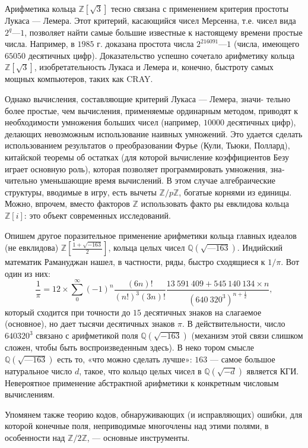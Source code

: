 \documentclass{mai_book}
\begin{document}
\pagebreak

Арифметика кольца $\mathbb{Z}[\sqrt{3}]$ тесно связана с применением критерия
простоты Лукаса — Лемера. Этот критерий, касающийся чисел Мерсенна, т.е. чисел вида $2^q—1$, позволяет найти самые большие известные
к настоящему времени простые числа. Например, в $1985$ г. доказана
простота числа $2^{216091}—1$ (числа, имеющего $65050$ десятичных цифр).
Доказательство успешно сочетало арифметику кольца $\mathbb{Z}[\sqrt{3}]$, изобрета­тельность Лукаса и Лемера и, конечно, быстроту самых мощных ком­пьютеров, таких как CRAY.

Однако вычисления, составляющие критерий Лукаса — Лемера, зна­чи-
тельно более простые, чем вычисления, применяемые ординарным
методом, приводят к необходимости умножения больших чисел (напри­мер, $10000$ десятичных цифр), делающих невозможным использование
наивных умножений. Это удается сделать использованием результатов
о преобразовании Фурье (Кули, Тьюки, Поллард), китайской теоре­мы об остатках (для которой вычисление коэффициентов Безу играет
основную роль), которая позволяет программировать умножения, зна­
чительно уменьшающие время вычислений. В этом случае алгебраиче­ские структуры, вводимые в игру, есть вычеты $\mathbb{Z}/p\mathbb{Z}$, богатые корнями
из единицы. Можно, впрочем, вместо факторов $\mathbb{Z}$ использовать факто­
ры евклидова кольца $\mathbb{Z}[i]$: это объект современных исследований.

Опишем другое поразительное применение арифметики кольца
главных идеалов (не евклидова) $\mathbb{Z}[\frac{1+\sqrt{-163}}{2}]$, кольца целых чисел
$\mathbb{Q}(\sqrt{—163})$. Индийский математик Рамануджан нашел, в частности, ря­ды, быстро сходящиеся к $1/\pi$. Вот один из них:
\[
\frac{1}{\pi}=12\times\sum_0^\infty(-1)^n\frac{(6n)!}{(n!)^3(3n)!}\frac{13~591~409 + 545~140~134 \times n}{(640~320^3)^{n+\frac{1}{2}}},
\]
который сходится при точности до $15$ десятичных знаков на слагаемое
(основное), но дает тысячи десятичных знаков $\pi$. В действительности,
число $640320^3$ связано с арифметикой поля $\mathbb{Q}(\sqrt{-163})$ (механизм этой
связи слишком сложен, чтобы быть воспроизведенным здесь). В неко­
тором смысле $\mathbb{Q}(\sqrt{—163})$ есть то, «что можно сделать лучше»: $163$ — самое большое натуральное число $d$, такое, что кольцо целых чисел в $\mathbb{Q}(\sqrt{-d})$ является КГИ. Невероятное применение абстрактной арифметики к конкретным числовым вычислениям.

Упомянем также теорию кодов, обнаруживающих (и исправляющих)
ошибки, для которой конечные поля, неприводимые многочлены над
этими полями, в особенности над $\mathbb{Z}/2\mathbb{Z}$, — основные инструменты.
\end{document}
